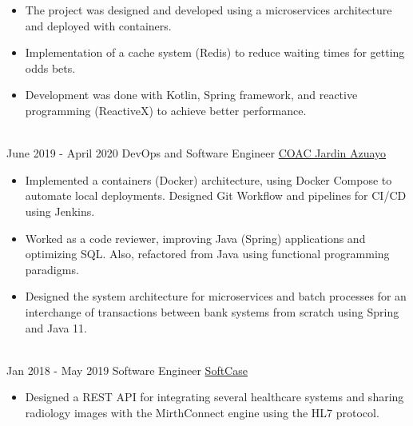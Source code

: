 \documentclass[letterpaper]{twentysecondcv} %
\begin{document}
\begin{twentyla}
{        \begin{itemize}
            \item The project was designed and developed using a microservices architecture and deployed with containers.
         \end{itemize}

        \begin{itemize}
            \item Implementation of a cache system (Redis) to reduce waiting times for getting odds bets.
         \end{itemize}

        \begin{itemize}
            \item Development was done with Kotlin, Spring framework, and reactive programming (ReactiveX) to achieve better performance.
         \end{itemize}
    }
    \\

\twentyitem
    {June 2019 -}
    {April 2020}
    {DevOps and Software Engineer}
    {\href{https://www.jardinazuayo.fin.ec/}{COAC Jardin Azuayo}}
    {}
    {
        \begin{itemize}
            \item Implemented a containers (Docker) architecture, using Docker Compose to automate local deployments. Designed Git Workflow and pipelines for CI/CD using Jenkins.
         \end{itemize}

        \begin{itemize}
            \item Worked as a code reviewer, improving Java (Spring) applications and optimizing SQL. Also, refactored from Java using functional programming paradigms.
         \end{itemize}

        \begin{itemize}
            \item Designed the system architecture for microservices and batch processes for an interchange of transactions between bank systems from scratch using Spring and Java 11.
         \end{itemize}
    }
    \\

\twentyitem
    {Jan 2018 -}
    {May 2019}
    {Software Engineer}
    {\href{http://www.softcase.com.ec/}{SoftCase}}
    {}
    {
        \begin{itemize}
            \item Designed a REST API for integrating several healthcare systems and sharing radiology images with the MirthConnect engine using the HL7 protocol.
         \end{itemize}

}
\end{twentyla}
\end{document}
